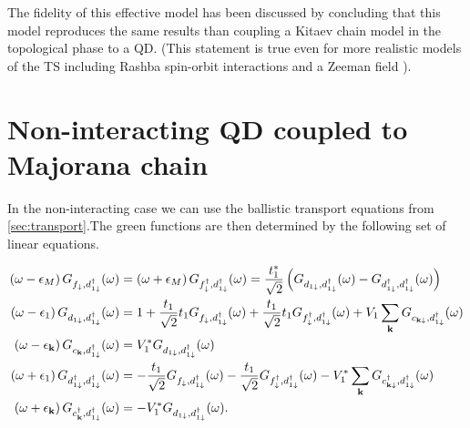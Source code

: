\noindent The fidelity of this effective model has been discussed by \citet{ruiz-tijerina_interaction_2015}
concluding that this model reproduces the
same results than coupling a  Kitaev chain model in the topological phase to a QD.
(This statement is true even for more realistic models of the TS including Rashba spin-orbit interactions and a Zeeman field \citep{ruiz-tijerina_interaction_2015}
).\\


\section{Non-interacting QD coupled to  Majorana chain \label{sec:GreenMaj-DQD}}

In the non-interacting case we can use the ballistic transport equations from \ref{sec:transport}.The green functions are then determined by the following set of linear equations. 




\begin{align}
    \left(\omega-\epsilon_{M}\right)G_{f_{\downarrow},d_{1\downarrow}^{\dagger}}(\omega)&=\left(\omega+\epsilon_{M}\right)G_{f_{\downarrow}^{\dagger},d_{1\downarrow}^{\dagger}}(\omega)=\frac{t^*_1}{\sqrt{2}}\left(G_{d_{1\downarrow},d_{1\downarrow}^{\dagger}}(\omega)-G_{d_{1\downarrow}^{\dagger},d_{1\downarrow}^{\dagger}}(\omega)\right) \label{eq:QDM1} \\ 
    \left(\omega-\epsilon_{1}\right)G_{d_{1\downarrow},d_{1\downarrow}^{\dagger}}(\omega)&=1+\frac{t_1}{\sqrt{2}}t_{1}G_{f_{\downarrow},d_{1\downarrow}^{\dagger}}(\omega)+\frac{t_1}{\sqrt{2}}t_{1}G_{f_{\downarrow}^{\dagger},d_{1\downarrow}^{\dagger}}(\omega)+V_{1}\sum_{\mathbf{k}}G_{c_{\mathbf{k\downarrow}},d_{1\downarrow}^{\dagger}}(\omega) \label{eq:QDM2} \\ 
    \left(\omega-\epsilon_{\mathbf{k}}\right)G_{c_{\mathbf{k}},d_{1\downarrow}^{\dagger}}(\omega)&=V_{1}^{*}G_{d_{1\downarrow},d_{1\downarrow}^{\dagger}}(\omega)\label{eq:QDM3} \\
    \left(\omega+\epsilon_{1}\right)G_{d_{1\downarrow}^{\dagger},d_{1\downarrow}^{\dagger}}(\omega)&=-\frac{t_1}{\sqrt{2}}G_{f_{\downarrow},d_{1\downarrow}^{\dagger}}(\omega)-\frac{t_1}{\sqrt{2}}G_{f_{\downarrow}^{\dagger},d_{1\downarrow}^{\dagger}}(\omega)-V_{1}^{*}\sum_{\mathbf{k}}G_{c_{\mathbf{k\downarrow}}^{\dagger},d_{1\downarrow}^{\dagger}}(\omega) \label{eq:QDM4} \\
    \left(\omega+\epsilon_{\mathbf{k}}\right)G_{c^\dagger_{\mathbf{k}},d_{1\downarrow}^{\dagger}}(\omega)&=-V_{1}^{*}G_{d_{1\downarrow},d_{1\downarrow}^{\dagger}}(\omega). \label{eq:QDM5}
\end{align}

